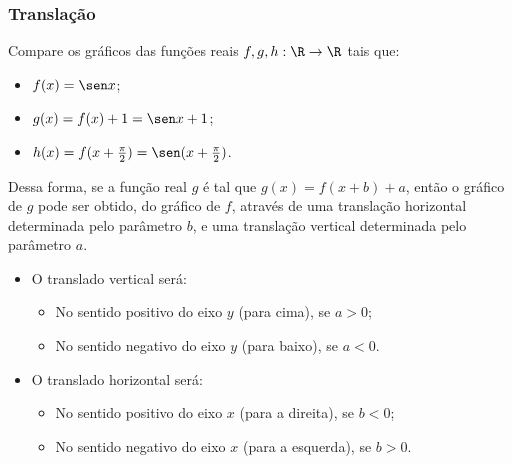 \subsubsection{Translação}

\begin{example}
    Compare os gráficos das funções reais $f, g , h: \R \to \R$ tais que:
    \begin{itemize}
    \item $f(x) = \sen x$;
    \item $g(x) = f(x) + 1 = \sen x +1$;
    \item $h(x)= f(x+\frac {\pi} 2)= \sen (x+ \frac {\pi} 2)$.
    \end{itemize}
\end{example}

\begin{center}
  
\end{center}

Dessa forma, se a função real $g$ é tal que $g(x) = f(x+b) +a$,
então o gráfico de $g$ pode ser obtido, do gráfico de $f$, através
de uma translação horizontal determinada pelo parâmetro $b$, e uma
translação vertical determinada pelo parâmetro $a$. 
\begin{itemize}
  \item O translado vertical será:
        \begin{itemize}
          \item No sentido positivo do eixo $y$ (para cima), se
          $a>0$;
          \item No sentido negativo do eixo $y$ (para baixo), se
          $a<0$.
        \end{itemize} 
  \item O translado horizontal será:
        \begin{itemize}
          \item No sentido positivo do eixo $x$ (para a direita), se $b<0$;
          \item No sentido negativo do eixo $x$ (para a esquerda), se $b>0$.
        \end{itemize}
\end{itemize}